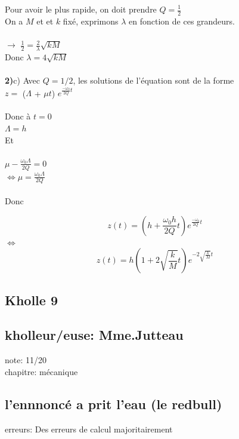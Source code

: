 \documentclass{article}
\begin{document}
Pour avoir le plus rapide, on doit prendre $Q = \frac12$ \\

On a $M$ et et $k$ fixé, exprimons $\lambda$ en fonction de ces grandeurs. \\ \\
$\rightarrow$ $\frac12 = \frac2\lambda \sqrt{kM}$ \\

Donc $\lambda = 4 \sqrt{kM}$ \\ \\

\textbf{2)}c) Avec $Q = 1/2$, les solutions de l'équation sont de la forme \\

$z = $ ($\Lambda$ + $\mu t$) $e^{\frac{-\omega_0}{2Q}t}$ \\ \\
Donc à $t=0$ \\
$\Lambda = h$ \\

Et \\ \\
$\mu - \frac{\omega_0 \Lambda}{2Q} = 0$ \\
$\Leftrightarrow \mu = \frac{\omega_0 \Lambda}{2Q}$ \\ \\

Donc

$$z(t) =  \left( h + \frac{\omega_0 h}{2Q} t \right) e^{\frac{-\omega_0}{2Q}t}$$
$\Leftrightarrow$ $$z(t) = h \left(1 + 2\sqrt{\frac{k}{M}} t \right) e^{-2\sqrt{\frac{k}{M}}t}$$







\subsection{Kholle 9}
\subsection{kholleur/euse: Mme.Jutteau}

note: 11/20 \\
chapitre: mécanique

\subsection{l'ennnoncé a prit l'eau (le redbull)}

erreurs: Des erreurs de calcul majoritairement
\end{document}
